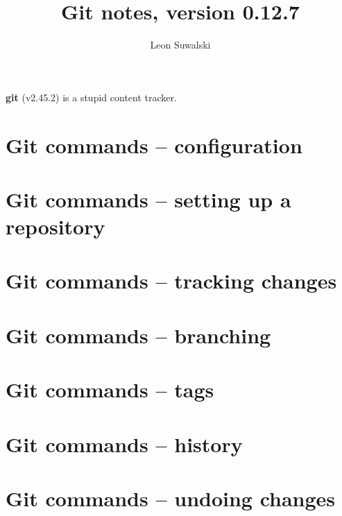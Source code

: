 \documentclass{charun}
\title{Git notes, version 0.12.7}
\author{Leon Suwalski}
\begin{document}
\maketitle
\raggedright

\textbf{git} (v2.45.2) is a stupid content tracker.

\section{Git commands -- configuration}


\section{Git commands -- setting up a repository}



\section{Git commands -- tracking changes}






\section{Git commands -- branching}







\section{Git commands -- tags}


\section{Git commands -- history}







\section{Git commands -- undoing changes}




\end{document}
